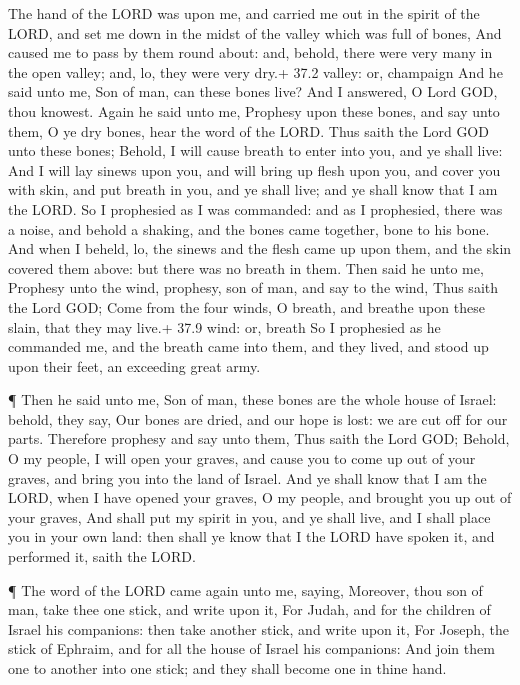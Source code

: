  The hand of the LORD was upon me, and carried me out in the
spirit of the LORD, and set me down in the midst of the valley which was
full of bones,  And caused me to pass by them round about:
and, behold, there were very many in the open valley; and, lo, they were
very dry.+ 37.2 valley: or, champaign  And he said unto me,
Son of man, can these bones live? And I answered, O Lord GOD, thou
knowest.  Again he said unto me, Prophesy upon these bones,
and say unto them, O ye dry bones, hear the word of the LORD.
 Thus saith the Lord GOD unto these bones; Behold, I will
cause breath to enter into you, and ye shall live:  And I
will lay sinews upon you, and will bring up flesh upon you, and cover
you with skin, and put breath in you, and ye shall live; and ye shall
know that I am the LORD.  So I prophesied as I was
commanded: and as I prophesied, there was a noise, and behold a shaking,
and the bones came together, bone to his bone.  And when I
beheld, lo, the sinews and the flesh came up upon them, and the skin
covered them above: but there was no breath in them.  Then
said he unto me, Prophesy unto the wind, prophesy, son of man, and say
to the wind, Thus saith the Lord GOD; Come from the four winds, O
breath, and breathe upon these slain, that they may live.+ 37.9 wind:
or, breath  So I prophesied as he commanded me, and the
breath came into them, and they lived, and stood up upon their feet, an
exceeding great army.

 ¶ Then he said unto me, Son of man, these bones are the
whole house of Israel: behold, they say, Our bones are dried, and our
hope is lost: we are cut off for our parts.  Therefore
prophesy and say unto them, Thus saith the Lord GOD; Behold, O my
people, I will open your graves, and cause you to come up out of your
graves, and bring you into the land of Israel.  And ye
shall know that I am the LORD, when I have opened your graves, O my
people, and brought you up out of your graves,  And shall
put my spirit in you, and ye shall live, and I shall place you in your
own land: then shall ye know that I the LORD have spoken it, and
performed it, saith the LORD.

 ¶ The word of the LORD came again unto me, saying,
 Moreover, thou son of man, take thee one stick, and write
upon it, For Judah, and for the children of Israel his companions: then
take another stick, and write upon it, For Joseph, the stick of Ephraim,
and for all the house of Israel his companions:  And join
them one to another into one stick; and they shall become one in thine
hand.

